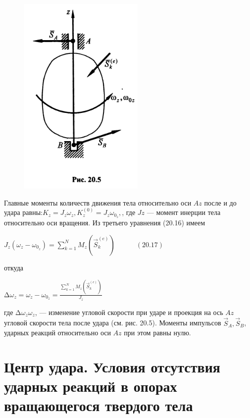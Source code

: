 {\begin{center}
\begin{figure}[H]
    \centering\includegraphics[scale=0.5]{img/20.5.jpeg} 
\end{figure}

\par Главные моменты  количеств движения тела относительно  оси  $Az$  после  и  до  удара  равны:$K_z = J_z \omega_z, K_z^{(0)} = J_z \omega_{0_z},$, где $Jz$ — момент инерции тела  относительно  оси  вращения.  Из  третьего уравнения (20.16) имеем

\par $J_z (\omega_z - \omega_{0_z}) = \sum\limits_{k=1}^N M_z (\vec{S}_k^{(e)}) \quad\quad\quad (20.17)$

\par откуда 

\par $∆\omega_z = \omega_z - \omega_{0_z} = \frac{\sum\limits_{k=1}^N M_z (\vec{S}_k^{(e)})}{J_z}$

\par где $∆\omega_z \omega_z$,  — изменение угловой скорости при ударе и проекция на ось $Az$ угловой скорости тела после удара (см. рис. 20.5). Моменты импульсов $\vec{S}_A, \vec{S}_B$,  ударных реакций относительно оси $Az$ при этом равны нулю.
    
\end{center}
\section{Центр удара. Условия отсутствия ударных реакций в опорах вращающегося твердого тела}
\begin{center}


\end{center}}

